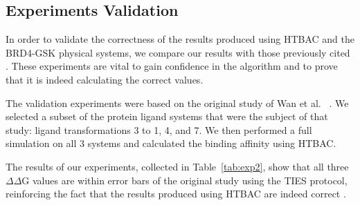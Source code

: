 \subsection{Experiments Validation}

In order to validate the correctness of the results produced using HTBAC and
the BRD4-GSK physical systems, we compare our results with those previously
cited . These experiments  are vital to gain confidence in
the algorithm  and to prove that it is indeed
calculating the correct values.

The validation experiments were based on the original study of Wan et
al.~\cite{Wan2017brd4} . We
selected a subset of the protein ligand systems that were the subject of that
study: ligand transformations 3 to 1, 4, and 7. We then performed a full
simulation on all 3 systems and calculated the binding affinity using HTBAC.

The results of our experiments, collected in Table~\ref{tab:exp2}, show that
all three $\Delta \Delta$G values are within error bars of the original study
using the TIES protocol, reinforcing  the fact that the
results produced using HTBAC are indeed correct
.

